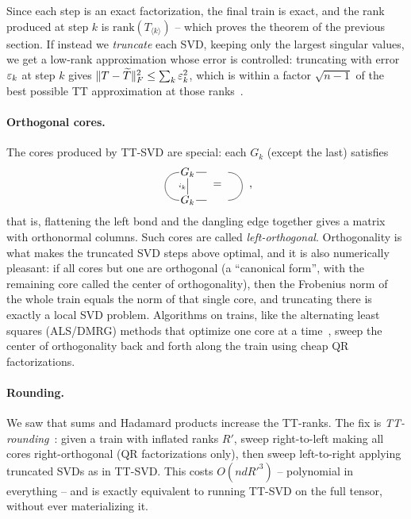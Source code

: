 Since each step is an exact factorization, the final train is exact,
and the rank produced at step $k$ is $\mathrm{rank}(T_{\langle k\rangle})$ -- which proves the theorem of the previous section.
If instead we \emph{truncate} each SVD, keeping only the largest singular values,
we get a low-rank approximation whose error is controlled:
truncating with error $\varepsilon_k$ at step $k$ gives
$\|T - \widetilde T\|_F^2 \le \sum_k \varepsilon_k^2$,
which is within a factor $\sqrt{n-1}$ of the best possible TT approximation at those ranks~\cite{oseledets_tt}.

\paragraph{Orthogonal cores.}
The cores produced by TT-SVD are special:
each $G_k$ (except the last) satisfies
\[
   \begin{tikzpicture}[baseline=-.05em, inner sep=1pt]
      \node (A) at (0,.45) {$G_k$};
      \node (B) at (0,-.45) {$G_k$};
      \draw (A) -- (B) node[midway, left, font=\tiny] {$i_k$};
      \draw (A) edge[out=180, in=180, looseness=1.7] (B);
      \draw (A) -- ++(.6,0);
      \draw (B) -- ++(.6,0);
   \end{tikzpicture}
   \;=\;
   \begin{tikzpicture}[baseline=-.05em, inner sep=1pt]
      \draw (0,.45) .. controls (.6,.45) and (.6,-.45) .. (0,-.45);
   \end{tikzpicture}
   \,,
\]
that is, flattening the left bond and the dangling edge together gives a matrix with orthonormal columns.
Such cores are called \emph{left-orthogonal}.
Orthogonality is what makes the truncated SVD steps above optimal,
and it is also numerically pleasant:
if all cores but one are orthogonal (a ``canonical form'', with the remaining core called the center of orthogonality),
then the Frobenius norm of the whole train equals the norm of that single core,
and truncating there is exactly a local SVD problem.
Algorithms on trains, like the alternating least squares (ALS/DMRG) methods that optimize one core at a time~\cite{holtz_als, schollwock_mps},
sweep the center of orthogonality back and forth along the train using cheap QR factorizations.

\paragraph{Rounding.}
We saw that sums and Hadamard products increase the TT-ranks.
The fix is \emph{TT-rounding}~\cite{oseledets_tt}: given a train with inflated ranks $R'$,
sweep right-to-left making all cores right-orthogonal (QR factorizations only),
then sweep left-to-right applying truncated SVDs as in TT-SVD.
This costs $O(n d R'^3)$ -- polynomial in everything -- and is exactly equivalent to running TT-SVD on the full tensor, without ever materializing it.

